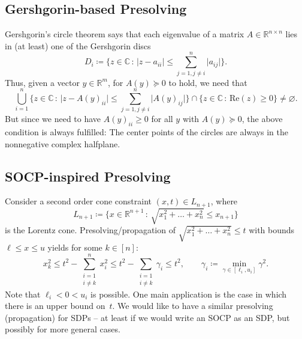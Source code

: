 \documentclass[10pt, a4paper]{article}
\renewcommand{\Re}{\text{Re}}
\newcommand{\suchthat}{\,:\,}
\newcommand{\abs}[1]{\lvert{#1}\rvert}
\newcommand{\define}{\coloneqq}
\newcommand{\R}{\mathds{R}}
\newcommand{\C}{\mathds{C}}
\begin{document}
\subsection{Gershgorin-based Presolving}

Gershgorin's circle theorem says that each eigenvalue of a matrix
$A \in \R^{n \times n}$ lies in (at least) one of the Gershgorin discs
\[
  D_i \define \Big\{z \in \C \suchthat \abs{z - a_{ii}} \leq \sum_{j=1, j \neq
    i}^n \abs{a_{ij}} \Big\}.
\]
Thus, given a vector $y \in \R^m$, for $A(y) \succeq 0$ to hold, we need
that
\[
  \bigcup_{i=1}^n \bigg\{z \in \C \suchthat \abs{z - A(y)_{ii}} \leq \sum_{j=1, j \neq
    i}^n \abs{A(y)_{ij}}\bigg\} \cap \{z \in \C \suchthat \Re(z) \geq 0\}
  \neq \varnothing.
\]
But since we need to have $A(y)_{ii} \geq 0$ for all $y$ with
$A(y) \succeq 0$, the above condition is always fulfilled: The center
points of the circles are always in the nonnegative complex halfplane.




\subsection{SOCP-inspired Presolving}

Consider a second order cone constraint $(x,t) \in L_{n+1}$, where
\[
  L_{n+1} \define \Big\{x \in \R^{n+1} \suchthat \sqrt{x_1^2 + \dots + x_n^2}
  \leq x_{n+1}\Big\}
\]
is the Lorentz cone.  Presolving/propagation of
$\sqrt{x_1^2 + \dots + x_n^2} \leq t$ with bounds $\ell \leq x \leq u$
yields for some $k \in [n]$:
\begin{equation}\label{eq:SOCPpre}
  x_k^2 \leq t^2 - \sum_{\substack{i=1\\ i \neq k}}^n x_i^2 \leq t^2 -
  \sum_{\substack{i=1\\ i \neq k}} \gamma_i \leq t^2,\qquad
  \gamma_i \define \min_{\gamma \in [\ell_i, u_i]} \gamma^2.
\end{equation}
Note that $\ell_i < 0 < u_i$ is possible. One main application is the case
in which there is an upper bound on~$t$. We would like to have a similar
presolving (propagation) for SDPs -- at least if we would write an SOCP as
an SDP, but possibly for more general cases.
\end{document}
